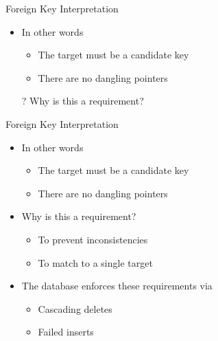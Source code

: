 \documentclass[aspectratio=169]{beamer}
\begin{document}
\begin{frame}{Foreign Key Interpretation}
\begin{itemize}
\item In other words
\begin{itemize}
\item The target must be a candidate key
\item There are no dangling pointers
\end{itemize}
\item[?] Why is this a requirement?
\end{itemize}

\end{frame}
\begin{frame}{Foreign Key Interpretation}
\begin{itemize}
\item In other words
\begin{itemize}
\item The target must be a candidate key
\item There are no dangling pointers
\end{itemize}
\item Why is this a requirement?
\begin{itemize}
\item To prevent inconsistencies
\item To match to a single target
\end{itemize}
\item The database enforces these requirements via
\begin{itemize}
\item Cascading deletes
\item Failed inserts
\end{itemize}
\end{itemize}

\end{frame}
\end{document}
